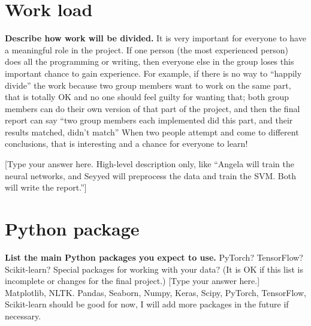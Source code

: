 \documentclass[a4paper,11pt]{article}
\begin{document}
\section{Work load}
\textbf{Describe how work will be divided.} It is very important for everyone to have a meaningful role in the project. If one person (the most experienced person) does all the programming or writing, then everyone else in the group loses this important chance to gain experience. For example, if there is no way to “happily divide” the work because two group members want to work on the same part, that is totally OK and no one should feel guilty for wanting that; both group members can do their own version of that part of the project, and then the final report can say “two group members each implemented did this part, and their results {matched, didn’t match}” When two people attempt and come to different conclusions, that is interesting and a chance for everyone to learn!

[Type your answer here. High-level description only, like “Angela will train the neural networks, and Seyyed will preprocess the data and train the SVM. Both will write the report.”]
\\


\newpage

\section{Python package}
\textbf{List the main Python packages you expect to use.} PyTorch? TensorFlow? Scikit-learn? Special packages for working with your data? (It is OK if this list is incomplete or changes for the final project.) 
[Type your answer here.]
\\

Matplotlib, NLTK. Pandas, Seaborn, Numpy, Keras, Scipy, PyTorch, TensorFlow, Scikit-learn should be good for now, I will add more packages in the future if necessary.

\pagebreak


\newpage


\nocite{*}
\end{document}
